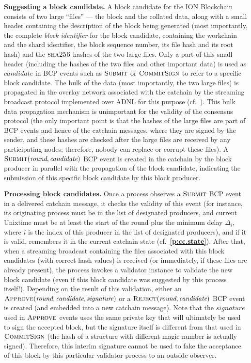 \documentclass[12pt,oneside]{article}
\def\makepoint#1{\medbreak\noindent{\bf #1.\ }}
\def\nxsubpoint{\refstepcounter{subsubsection}%
  \smallbreak\makepoint{\thesubsubsection}}
\def\refpoint#1{{\rm\textbf{\ref{#1}}}}
\let\ptref=\refpoint
\def\emb#1{\textbf{#1.}}
\let\vr=\textit
\def\opsc#1{\operatorname{\textsc{#1}}}
\def\Sha{\opsc{sha256}}
\def\Submit{\opsc{Submit}}
\def\Approve{\opsc{Approve}}
\def\Reject{\opsc{Reject}}
\def\CommitSign{\opsc{CommitSign}}
\def\wround{\vr{round}}
\def\wcandidate{\vr{candidate}}
\def\wsignature{\vr{signature}}
\begin{document}
\nxsubpoint\emb{Suggesting a block candidate}
A block candidate for the ION Block\-chain consists of two large ``files'' --- the block and the collated data, along with a small header containing the description of the block being generated (most importantly, the complete {\em block identifier\/} for the block candidate, containing the workchain and the shard identifier, the block sequence number, its file hash and its root hash) and the $\Sha$ hashes of the two large files. Only a part of this small header (including the hashes of the two files and other important data) is used as $\wcandidate$ in BCP events such as $\Submit$ or $\CommitSign$ to refer to a specific block candidate. The bulk of the data (most importantly, the two large files) is propagated in the overlay network associated with the catchain by the streaming broadcast protocol implemented over ADNL for this purpose (cf.~\cite[5]{ION}). This bulk data propagation mechanism is unimportant for the validity of the consensus protocol (the only important point is that the hashes of the large files are part of BCP events and hence of the catchain messages, where they are signed by the sender, and these hashes are checked after the large files are received by any participating nodes; therefore, nobody can replace or corrupt these files). A $\Submit(\wround,\wcandidate)$ BCP event is created in the catchain by the block producer in parallel with the propagation of the block candidate, indicating the submission of this specific block candidate by this block producer.

\nxsubpoint\emb{Processing block candidates}
Once a process observes a $\Submit$ BCP event in a delivered catchain message, it checks the validity of this event (for instance, its originating process must be in the list of designated producers, and current Unixtime must be at least the start of the round plus the minimum delay $\Delta_i$, where $i$ is the index of this producer in the list of designated producers), and if it is valid, remembers it in the current catchain state (cf.~\ptref{p:cc.state}). After that, when a streaming broadcast containing the files associated with this block candidates (with correct hash values) is received (or immediately, if these files are already present), the process invokes a validator instance to validate the new block candidate (even if this block candidate was suggested by this process itself!). Depending on the result of this validation, either an $\Approve(\wround,\wcandidate,\wsignature)$ or a $\Reject(\wround,\wcandidate)$ BCP event is created (and embedded into a new catchain message). Note that the $\wsignature$ used in $\Approve$ events uses the same private key that will ultimately be used to sign the accepted block, but the signature itself is different from that used in $\CommitSign$ (the hash of a structure with different magic number is actually signed). Therefore, this interim signature cannot be used to fake the acceptance of this block by this particular validator process to an outside observer.
\end{document}
